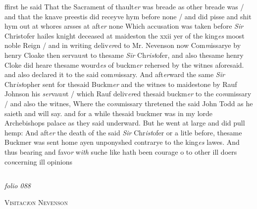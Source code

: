 \documentclass[12pt, a4paper]{book}
\begin{document}
	
		\ifthenelse{\isodd{\thepage}}
		{\reversemarginpar}
		{\normalmarginpar}
		ffirst he said That the Sacrament of thault\textit{er }was
 breade as other breade was / and that the knave
 preestis did receyve hym before none / and did pisse
 and shit hym out at whores arsses at aft\textit{er} none
		Which accusation was taken before \textit{Sir} Christofer
 hailes knight deceased at maideston the xxii yer of the
 	king\textit{es} moost noble Reign / and in writing deliv\textit{er}ed to Mr.
 		Nevenson now Com\textit{m}issarye by henry Cloake then servau\textit{n}t
		to thesame \textit{Sir} Ch\textit{rist}ofer, and also thesame henry Cloke
		did heare thesame wourd\textit{es} of buckm\textit{er} rehersed by the
 witnes aforesaid. and also declared it to the said com\textit{m}issary.
		And aft\textit{er}ward the same \textit{Sir} Chr\textit{ist}opher sent for thesaid
		Buckm\textit{er} and the witnes to maidestone by Rauf Johnson
		his \textit{ser}vau\textit{n}t / which Rauf deliv\textit{er}ed thesaid buckm\textit{er} to the
		co\textit{m}missary / and also the witnes, Where the co\textit{m}missary
		thretened the said John Todd as he saieth and will say.
		and for a while thesaid buckmer was in my lorde
 Archebishops palace as they said underward. But
 he went at large and did pull hemp: And aft\textit{er} the
		death of the said \textit{Sir} Chr\textit{ist}ofer or a litle before, thesame
		Buckmer was sent home ayen unponyshed contrarye
 to the king\textit{es} lawes. And thus bearing and favo\textit{r}
 w\textit{ith} suche like hath been courage o to other ill doers
 co\textit{n}cerning ill opinions
 


            
\dotfill
					  \subsection*{}

\textit{folio 088}


            
            	
				\begin{center} \begin{large} {\scshape Visitac\textit{i}on Nevenson} \end{large} \end{center}
			
            	
            	
            		
				\marginpar[\vspace{0.5cm}{\textcolor{Gray}{n}}]{}
			
\end{document}
